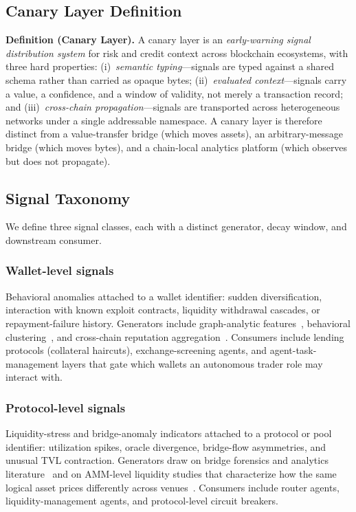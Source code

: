\documentclass[journal]{IEEEtran}
\begin{document}
\subsection{Canary Layer Definition}

\textbf{Definition (Canary Layer).} A canary layer is an
\emph{early-warning signal distribution system} for risk and credit
context across blockchain ecosystems, with three hard properties:
(i)~\emph{semantic typing}---signals are typed against a shared schema
rather than carried as opaque bytes;
(ii)~\emph{evaluated context}---signals carry a value, a confidence, and
a window of validity, not merely a transaction record; and
(iii)~\emph{cross-chain propagation}---signals are transported across
heterogeneous networks under a single addressable namespace. A canary
layer is therefore distinct from a value-transfer bridge (which moves
assets), an arbitrary-message bridge (which moves bytes), and a
chain-local analytics platform (which observes but does not propagate).

\subsection{Signal Taxonomy}\label{sec:arch:taxonomy}

We define three signal classes, each with a distinct generator, decay
window, and downstream consumer.

\subsubsection{Wallet-level signals}
Behavioral anomalies attached to a wallet identifier: sudden
diversification, interaction with known exploit contracts, liquidity
withdrawal cascades, or repayment-failure history. Generators include
graph-analytic
features~\cite{ChenLZCLLLZ20,SerenaFD22,MotamedB19}, behavioral
clustering~\cite{FanLZJB20}, and cross-chain reputation
aggregation~\cite{HasanBB23,AlmasoudHH20}. Consumers include lending
protocols (collateral haircuts), exchange-screening agents, and
agent-task-management layers that gate which wallets an autonomous
trader role may interact with.

\subsubsection{Protocol-level signals}
Liquidity-stress and bridge-anomaly indicators attached to a protocol
or pool identifier: utilization spikes, oracle divergence, bridge-flow
asymmetries, and unusual TVL contraction. Generators draw on bridge
forensics and analytics literature~\cite{MishraP25,LiQXZZWX25,
ZhangZZL24,augusto2024sok} and on AMM-level liquidity studies that
characterize how the same logical asset prices differently across
venues~\cite{gogol2024liquidity}. Consumers include router agents,
liquidity-management agents, and protocol-level circuit breakers.
\end{document}
